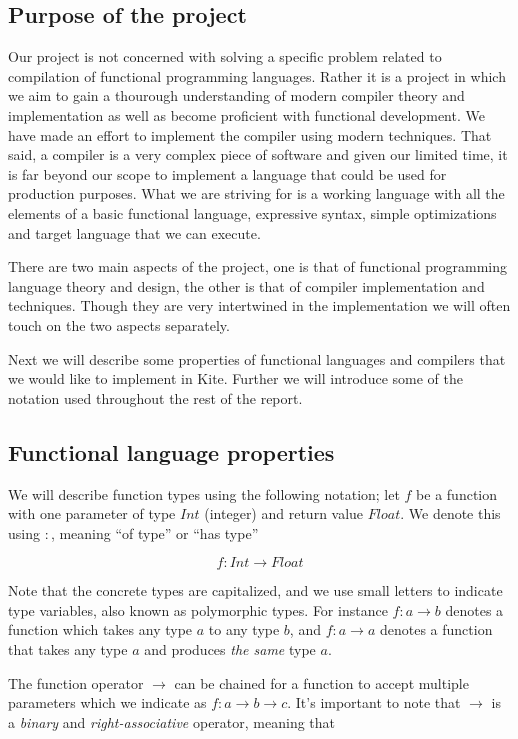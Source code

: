 \subsection{Purpose of the project}
Our project is not concerned with solving a specific problem related to compilation of functional programming languages. Rather it is a project in which we aim to gain a thourough understanding of modern compiler theory and implementation as well as become proficient with functional development. We have made an effort to implement the compiler using modern techniques. That said, a compiler is a very complex piece of software and given our limited time, it is far beyond our scope to implement a language that could be used for production purposes. What we are striving for is a working language with all the elements of a basic functional language, expressive syntax, simple optimizations and target language that we can execute.

There are two main aspects of the project, one is that of functional programming language theory and design, the other is that of compiler implementation and techniques. Though they are very intertwined in the implementation we will often touch on the two aspects separately.

Next we will describe some properties of functional languages and compilers that we would like to implement in Kite. Further we will introduce some of the notation used throughout the rest of the report.

\subsection{Functional language properties}
We will describe function types using the following notation; let $f$ be a function with one parameter of type $Int$ (integer) and return value $Float$. We denote this using $:$, meaning ``of type'' or ``has type''

\[ f: Int \to Float \]

Note that the concrete types are capitalized, and we use small letters to indicate type variables, also known as polymorphic types. For instance $f: a \to b$ denotes a function which takes any type $a$ to any type $b$, and $f: a \to a$ denotes a function that takes any type $a$ and produces \emph{the same} type $a$.

The function operator $\to$ can be chained for a function to accept multiple parameters which we indicate as $f: a \to b \to c$. It's important to note that $\to$ is a \emph{binary} and \emph{right-associative} operator, meaning that

